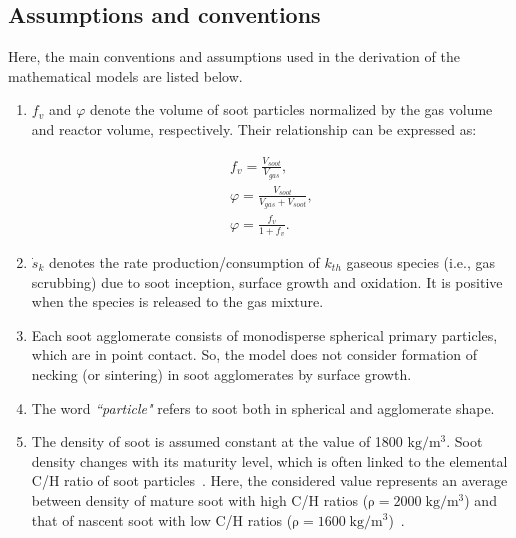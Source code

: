 \subsection{Assumptions and conventions}
Here, the main conventions and assumptions used in the derivation of the mathematical models are listed below.

\begin{enumerate}

\item $f_v$ and $\varphi$ denote the volume of soot particles normalized by the gas volume and reactor volume, respectively. Their relationship can be expressed as:

\begin{equation}
	\begin{split}
		f_v = \frac{V_{soot}}{V_{gas}}, \\
		\varphi = \frac{V_{soot}}{V_{gas} + V_{soot}}, \\
		\varphi = \frac{f_v}{1 + f_v}
		\label{eqn:fvdef}.
	\end{split}
\end{equation}

\item ${\dot{s}_k}$ denotes the rate production/consumption of $k_{th}$ gaseous species (i.e., gas scrubbing) due to soot inception, surface growth and oxidation. It is positive when the species is released to the gas mixture.

\item Each soot agglomerate consists of monodisperse spherical primary particles, which are in point contact. So, the model does not consider formation of necking (or sintering) in soot agglomerates by surface growth.


\item The word \textit{``particle"} refers to soot both in spherical and agglomerate shape. 

\item The density of soot is assumed constant at the value of 1800 $\mathrm{kg/m^3}$. Soot density changes with its maturity level, which is often linked to the elemental C/H ratio of soot particles~\citep{michelsen2021effects}. Here, the considered value represents an average between density of mature soot with high C/H ratios ($\mathrm{\rho=2000\;kg/m^3}$) and that of nascent soot with low C/H ratios ($\mathrm{\rho=1600\;kg/m^3}$)~\citep{jensen2007measurement, michelsen2021effects}.


\end{enumerate}
